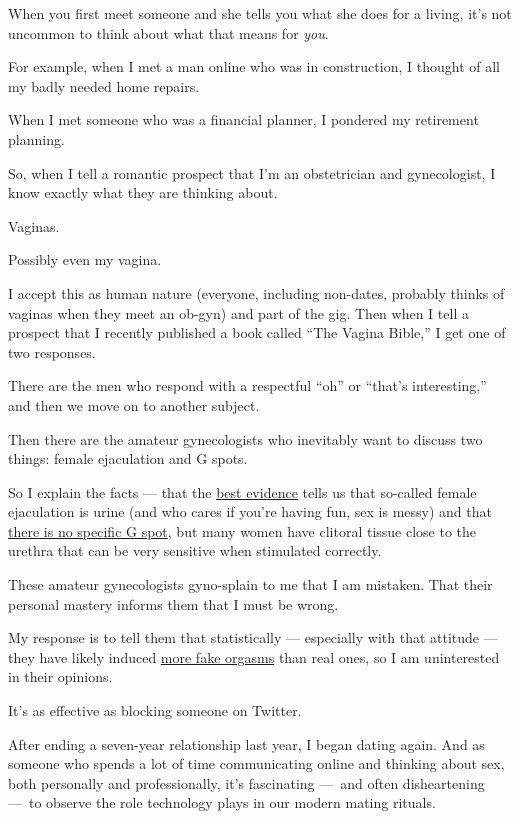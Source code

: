 When you first meet someone and she tells you what she does for a
living, it's not uncommon to think about what that means for \emph{you}.

For example, when I met a man online who was in construction, I thought
of all my badly needed home repairs.

When I met someone who was a financial planner, I pondered my retirement
planning.

So, when I tell a romantic prospect that I'm an obstetrician and
gynecologist, I know exactly what they are thinking about.

Vaginas.

Possibly even my vagina.

I accept this as human nature (everyone, including non-dates, probably
thinks of vaginas when they meet an ob-gyn) and part of the gig. Then
when I tell a prospect that I recently published a book called ``The
Vagina Bible,'' I get one of two responses.

There are the men who respond with a respectful ``oh'' or ``that's
interesting,'' and then we move on to another subject.

Then there are the amateur gynecologists who inevitably want to discuss
two things: female ejaculation and G spots.

So I explain the facts --- that the
\href{https://onlinelibrary.wiley.com/doi/abs/10.1111/jsm.12799}{best
evidence} tells us that so-called female ejaculation is urine (and who
cares if you're having fun, sex is messy) and that
\href{https://www.nytimes3xbfgragh.onion/ask/answers/how-do-i-find-my-g-spot}{there
is no specific G spot}, but many women have clitoral tissue close to the
urethra that can be very sensitive when stimulated correctly.

These amateur gynecologists gyno-splain to me that I am mistaken. That
their personal mastery informs them that I must be wrong.

My response is to tell them that statistically --- especially with that
attitude --- they have likely induced
\href{https://www.nytimes3xbfgragh.onion/2018/12/21/style/jen-gunter-says-your-vagina-is-terrific.html}{more
fake orgasms} than real ones, so I am uninterested in their opinions.

It's as effective as blocking someone on Twitter.

After ending a seven-year relationship last year, I began dating again.
And as someone who spends a lot of time communicating online and
thinking about sex, both personally and professionally, it's fascinating
---~and often disheartening ---~to observe the role technology plays in
our modern mating rituals.

